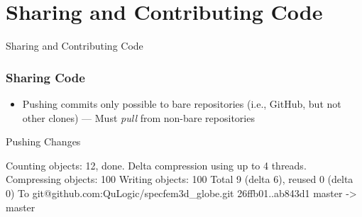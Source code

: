 \section{Sharing and Contributing Code}

\begin{frame}
 \vfill
 \begin{center}
  \LARGE \color{solarizedAccent} Sharing and Contributing Code
 \end{center}
 \vfill
\end{frame}

\begin{frame}[fragile]
 \frametitle{Sharing Code}

 \begin{itemize}
  \item Pushing commits only possible to \alert{bare} repositories (i.e.,
        GitHub, but not other clones) --- Must \textit{pull} from non-bare
        repositories
 \end{itemize}

 \begin{exampleblock}{Pushing Changes}
  \begin{semiverbatim}
Counting objects: 12, done.
Delta compression using up to 4 threads.
Compressing objects: 100%
Writing objects: 100%
Total 9 (delta 6), reused 0 (delta 0)
To git@github.com:QuLogic/specfem3d_globe.git
   26ffb01..ab843d1  master -> master
\end{semiverbatim}
 \end{exampleblock}
\end{frame}

